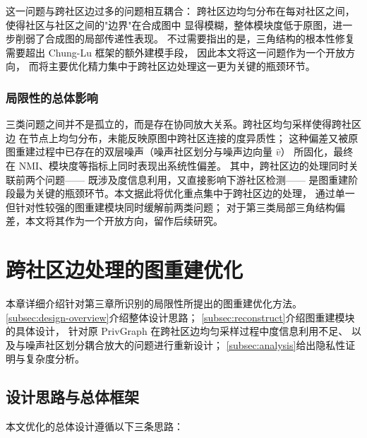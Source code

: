 \par 这一问题与跨社区边过多的问题相互耦合：
跨社区边均匀分布在每对社区之间，使得社区与社区之间的"边界"在合成图中
显得模糊，整体模块度低于原图，进一步削弱了合成图的局部传递性表现。
不过需要指出的是，三角结构的根本性修复需要超出 Chung-Lu 框架的额外建模手段，
因此本文将这一问题作为一个开放方向，
而将主要优化精力集中于跨社区边处理这一更为关键的瓶颈环节。

\subsubsection{局限性的总体影响}

\par 三类问题之间并不是孤立的，而是存在协同放大关系。跨社区均匀采样使得跨社区边
在节点上均匀分布，未能反映原图中跨社区连接的度异质性；
这种偏差又被原图重建过程中已存在的双层噪声（噪声社区划分与噪声边向量 $\hat{v}$）
所固化，最终在 NMI、模块度等指标上同时表现出系统性偏差。
其中，跨社区边的处理同时关联前两个问题——
既涉及度信息利用，又直接影响下游社区检测——
是图重建阶段最为关键的瓶颈环节。本文据此将优化重点集中于跨社区边的处理，
通过单一但针对性较强的图重建模块同时缓解前两类问题；
对于第三类局部三角结构偏差，本文将其作为一个开放方向，留作后续研究。

\clearpage
\section{跨社区边处理的图重建优化}

\par 本章详细介绍针对第三章所识别的局限性所提出的图重建优化方法。
\autoref{subsec:design-overview}介绍整体设计思路；
\autoref{subsec:reconstruct}介绍图重建模块的具体设计，
针对原 PrivGraph 在跨社区边均匀采样过程中度信息利用不足、
以及与噪声社区划分耦合放大的问题进行重新设计；
\autoref{subsec:analysis}给出隐私性证明与复杂度分析。

\subsection{设计思路与总体框架}
\label{subsec:design-overview}

\par 本文优化的总体设计遵循以下三条思路：

